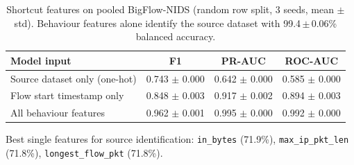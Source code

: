 \begin{table}[t]
\centering
\small
\caption{Shortcut features on pooled BigFlow-NIDS (random row split, 3 seeds, mean $\pm$ std). Behaviour features alone identify the source dataset with 99.4\,$\pm$\,0.06\% balanced accuracy.}
\label{tab:shortcuts}
\begin{tabular}{lccc}
\toprule
Model input & F1 & PR-AUC & ROC-AUC \\
\midrule
Source dataset only (one-hot) & 0.743 $\pm$ 0.000 & 0.642 $\pm$ 0.000 & 0.585 $\pm$ 0.000 \\
Flow start timestamp only & 0.848 $\pm$ 0.003 & 0.917 $\pm$ 0.002 & 0.894 $\pm$ 0.003 \\
All behaviour features & 0.962 $\pm$ 0.001 & 0.995 $\pm$ 0.000 & 0.992 $\pm$ 0.000 \\
\bottomrule
\end{tabular}
\par\smallskip\parbox{\linewidth}{\footnotesize Best single features for source identification: \texttt{in\_bytes} (71.9\%), \texttt{max\_ip\_pkt\_len} (71.8\%), \texttt{longest\_flow\_pkt} (71.8\%).}
\end{table}
